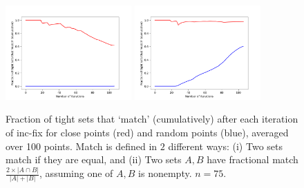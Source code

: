 \documentclass{article}
\begin{document}
\begin{figure}
    \centering
    \includegraphics[width=0.43\textwidth]{code/figures/tight-set-matches/absolute-75.png}
    \includegraphics[width=0.43\textwidth]{code/figures/tight-set-matches/75.png}
    \caption{Fraction of tight sets that `match' (cumulatively) after each iteration of inc-fix for close points (red) and random points (blue), averaged over 100 points. Match is defined in $2$ different ways: (i) Two sets match if they are equal, and (ii) Two sets $A, B$ have fractional match $\frac{2 \times |A \cap B|}{|A| + |B|}$, assuming one of $A, B$ is nonempty. $n = 75$.}
    \label{fig:tight-set-matches-vs-iteration}
\end{figure}
\end{document}
